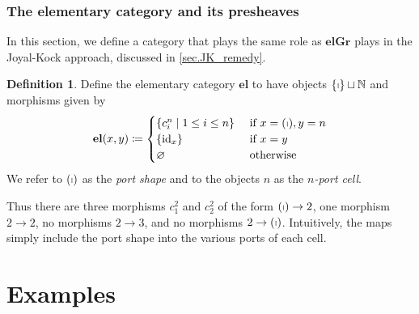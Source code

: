 \documentclass[11pt, article, oneside]{memoir}
\theoremstyle{plain}
\theoremstyle{definition}
\newtheorem{definition}[theorem]{Definition}
\theoremstyle{remark}
\newcommand{\Cat}[1]{\mathbf{#1}}
\DeclareMathOperator{\id}{id}
\newcommand{\NN}{\mathbb{N}}
\newcommand{\tn}[1]{\textnormal{#1}}
\newcommand\elGr{\Cat{elGr}}
\newcommand\el{\Cat{el}}
\newcommand\stick{\shortmid}
\begin{document}
\subsection{The elementary category and its presheaves}

In this section, we define a category that plays the same role as $\elGr$ plays in the Joyal-Kock approach, discussed in \cref{sec.JK_remedy}.

\begin{definition}
Define the elementary category $\el$ to have objects $\{\stick\}\sqcup\NN$ and morphisms given by
\[
  \el(x,y)\coloneqq
  \begin{cases}
  	\{c^n_i\mid 1\leq i\leq n\}&\tn{ if }x=(\stick), y=n\\
		\{\id_x\}&\tn{ if }x=y\\
		\varnothing&\tn{ otherwise}
  \end{cases}
\]
We refer to $(\stick)$ as the \emph{port shape} and to the objects $n$ as the \emph{$n$-port cell}.
\end{definition}
Thus there are three morphisms $c^2_1$ and $c^2_2$ of the form $(\stick)\to 2$, one morphism $2\to 2$, no morphisms $2\to 3$, and no morphisms $2\to(\stick)$. Intuitively, the maps simply include the port shape into the various ports of each cell.


\chapter{Examples}


\printbibliography
\printindex
\end{document}
